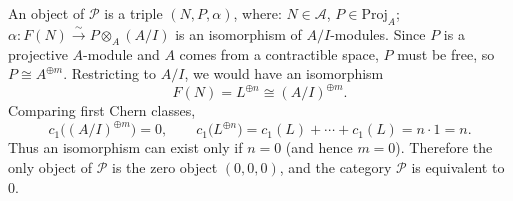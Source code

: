 \documentclass[a4paper,10pt, oneside]{amsart}
\begin{document}
\begin{exam}
		An object of $\mathcal{P}$ is a triple $(N, P, \alpha)$, where:
		$N \in \mathcal{A}$, 
		$P \in \mathrm{Proj}_A$;
		$\alpha: F(N) \xrightarrow{\sim} P \otimes_A (A/I)$ is an isomorphism of $A/I$-modules. Since $P$ is a projective $A$-module and $A$ comes from a contractible space, $P$ must be free, so $P \cong A^{\oplus m}$. Restricting to $A/I$, we would have an isomorphism
		$$F(N)=L^{\oplus n} \cong (A/I)^{\oplus m}.$$
		Comparing first Chern classes,
		$$c_1\big((A/I)^{\oplus m}\big) = 0, \qquad c_1\big(L^{\oplus n}\big) = c_1(L) + \cdots + c_1(L) = n \cdot 1 = n.$$
		Thus an isomorphism can exist only if $n = 0$ (and hence $m = 0$). Therefore the only object of $\mathcal{P}$ is the zero object $(0,0,0)$, and the category $\mathcal{P}$ is equivalent to $0$.
	\end{exam}
	
\end{document}
